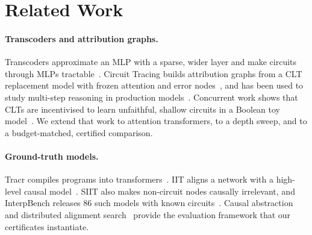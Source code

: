 \section{Related Work}
\paragraph{Transcoders and attribution graphs.} Transcoders approximate an MLP with a sparse, wider layer and make circuits through MLPs tractable~\cite{dunefsky2024transcoders}. Circuit Tracing builds attribution graphs from a CLT replacement model with frozen attention and error nodes~\cite{ameisen2025circuit}, and has been used to study multi-step reasoning in production models~\cite{lindsey2025biology}. Concurrent work shows that CLTs are incentivised to learn unfaithful, shallow circuits in a Boolean toy model~\cite{clt_unfaithful2026}. We extend that work to attention transformers, to a depth sweep, and to a budget-matched, certified comparison.
\paragraph{Ground-truth models.} Tracr compiles programs into transformers~\cite{lindner2023tracr}. IIT aligns a network with a high-level causal model~\cite{geiger2022iit}. SIIT also makes non-circuit nodes causally irrelevant, and InterpBench releases 86 such models with known circuits~\cite{gupta2024interpbench}. Causal abstraction~\cite{geiger2021causal} and distributed alignment search~\cite{geiger2024das} provide the evaluation framework that our certificates instantiate.
